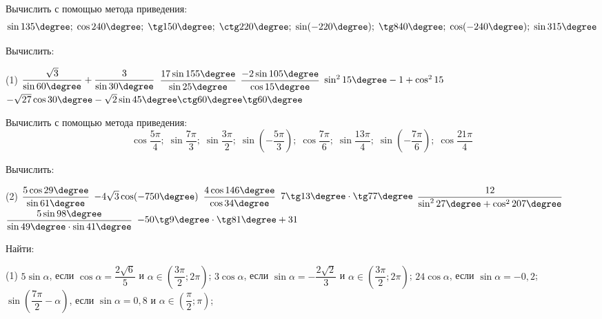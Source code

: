 %
%

\begin{class}[number=1]
	\begin{listofex}
		\item Вычислить с помощью метода приведения:
		\[ \sin135\degree;\;\cos240\degree;\;\tg150\degree;\;\ctg220\degree;\;\sin(-220\degree);\;\tg840\degree;\;\cos(-240\degree);\;\sin315\degree \]
		\item Вычислить:
		\begin{tasks}(1)
			\task \( \dfrac{\sqrt{3}}{\sin60\degree}+\dfrac{3}{\sin30\degree} \)
			\task \( \dfrac{17\sin155\degree}{\sin25\degree} \)
			\task \( \dfrac{-2\sin105\degree}{\cos15\degree} \)
			\task \( \sin^215\degree-1+\cos^215 \)
			\task \( -\sqrt{27}\cos30\degree-\sqrt{2}\sin45\degree\ctg60\degree\tg60\degree\)
		\end{tasks}
		\item Вычислить с помощью метода приведения:
		\[ \cos\dfrac{5\pi}{4};\;\sin\dfrac{7\pi}{3};\;\sin\dfrac{3\pi}{2};\;\sin\left( -\dfrac{5\pi}{3} \right);\;\cos\dfrac{7\pi}{6};\;\sin\dfrac{13\pi}{4};\;\sin\left( -\dfrac{7\pi}{6}  \right);\;\cos\dfrac{21\pi}{4} \]
		\item Вычислить:
		\begin{tasks}(2)
			\task \( \dfrac{5\cos29\degree}{\sin61\degree} \)
			\task \( -4\sqrt{3}\cos(-750\degree) \)
			\task \( \dfrac{4\cos146\degree}{\cos34\degree} \)
			\task \( 7\tg13\degree\cdot\tg77\degree \)
			\task \( \dfrac{12}{\sin^227\degree+\cos^2207\degree} \)
			\task \( \dfrac{5\sin98\degree}{\sin49\degree\cdot\sin41\degree} \)
			\task \( -50\tg9\degree\cdot\tg81\degree+31 \)
		\end{tasks}
		\item Найти:
		\begin{tasks}(1)
			\task \( 5\sin\alpha \), \quad если \( \cos\alpha=\dfrac{2\sqrt{6}}{5} \) и \( \alpha\in\left( \dfrac{3\pi}{2}; 2\pi \right) \);
			\task \( 3\cos\alpha \), \quad если \( \sin\alpha=-\dfrac{2\sqrt{2}}{3} \) и \( \alpha\in\left( \dfrac{3\pi}{2}; 2\pi \right) \);
			\task \( 24\cos\alpha \), \quad если \( \sin\alpha=-0,2 \);
			\task \( \sin\left( \dfrac{7\pi}{2}-\alpha \right) \), \quad если \( \sin\alpha=0,8 \) и \( \alpha\in\left( \dfrac{\pi}{2}; \pi \right) \);			
		\end{tasks}
	\end{listofex}
\end{class}

